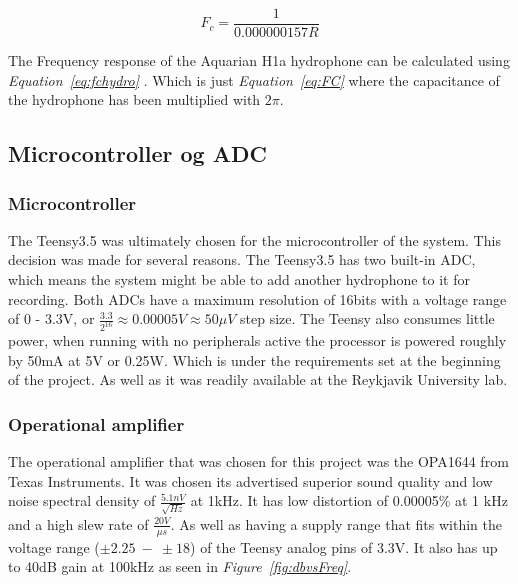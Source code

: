 \clearpage

\begin{equation}
    F_c = \frac{1}{ 0.000000157 R}  
\label{eq:fchydro}
\end{equation}

The Frequency response of the Aquarian H1a hydrophone can be calculated using \textit{Equation~\ref{eq:fchydro}} \cite{noauthor_aquarian_nodate}. 
Which is just \textit{Equation~\ref{eq:FC}} where the capacitance of the hydrophone has been multiplied with $2\pi$.


\subsection{Microcontroller og ADC}

\subsubsection{Microcontroller}
The Teensy3.5 was ultimately chosen for the microcontroller of the system.
This decision was made for several reasons.
The Teensy3.5 has two built-in ADC, which means the system might be able to add another hydrophone to it for recording.
Both ADCs have a maximum resolution of 16bits with a voltage range of 0 - 3.3V, or $\frac{3.3}{2^{16}} \approx 0.00005V \approx 50\mu V$ step size.
The Teensy also consumes little power, when running with no peripherals active the processor is powered roughly by 50mA at 5V or 0.25W.
Which is under the requirements set at the beginning of the project.
As well as it was readily available at the Reykjavik University lab.

\subsubsection{Operational amplifier}

The operational amplifier that was chosen for this project was the OPA1644 from Texas Instruments.
It was chosen its advertised superior sound quality and low noise spectral density of $\frac{5.1nV}{\sqrt{Hz}}$ at 1kHz.
It has low distortion of 0.00005\% at 1 kHz and a high slew rate of $\frac{20V}{\mu s}$.
As well as having a supply range that fits within the voltage range ($\pm2.25~-~\pm18$) of the Teensy analog pins of 3.3V\cite{noauthor_opa164x_nodate}.
It also has up to 40dB gain at 100kHz as seen in \textit{Figure~\ref{fig:dbvsFreq}}.

